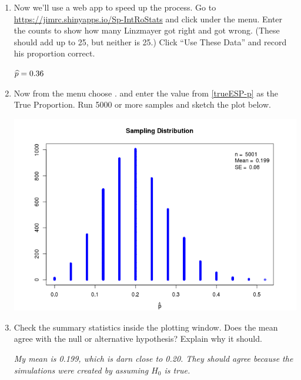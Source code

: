 \begin{enumerate}
  \item Now we'll use a web app to speed up the process.  Go to
     \url{https://jimrc.shinyapps.io/Sp-IntRoStats} and click
        under the  menu.
       Enter the counts to show how many Linzmayer got right and got
       wrong. (These should add up to 25, but neither is 25.)
       Click ``Use These Data'' and record his proportion correct.

\begin{students}
  \vspace{1cm}
\end{students}
\begin{key}
{\it $\widehat{p} = 0.36$}
\end{key}

   \item Now from the  menu choose . and enter
     the value from \ref{trueESP-p} as the True Proportion.   Run 5000
     or more samples  and sketch the plot below.
\begin{students}
  \vspace{2cm}
\end{students}

\begin{key}
  \includegraphics[width = .5\linewidth]{../plots/ESP-5001Draws.png}
\end{key}

     \item Check the summary statistics inside the plotting window.
       Does the mean agree with the null or alternative hypothesis?
       Explain why it should.
\begin{students}
  \vspace{1.2cm}
\end{students}
\begin{key}
{\it My mean is 0.199, which is darn close to 0.20. They should agree
  because the simulations were created by assuming $H_0$ is true.}
\end{key}
\\


\end{enumerate}
